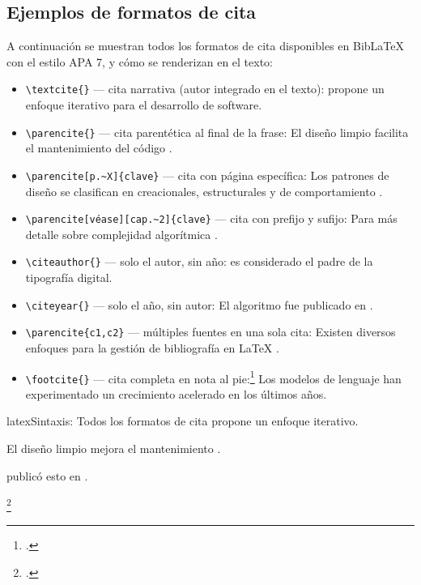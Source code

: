 \subsection{Ejemplos de formatos de cita}
\label{subsec:ejemplos-formatos-cita}

A continuación se muestran todos los formatos de cita disponibles en BibLaTeX
con el estilo APA 7, y cómo se renderizan en el texto:

\begin{itemize}
  \item \verb|\textcite{}| --- cita narrativa (autor integrado en el texto):
    \textcite{pressman2020} propone un enfoque iterativo para el desarrollo de software.
  \item \verb|\parencite{}| --- cita parentética al final de la frase:
    El diseño limpio facilita el mantenimiento del código \parencite{martin2019}.
  \item \verb|\parencite[p.~X]{clave}| --- cita con página específica:
    Los patrones de diseño se clasifican en creacionales, estructurales y de comportamiento
    \parencite[p.~10]{gamma1994}.
  \item \verb|\parencite[véase][cap.~2]{clave}| --- cita con prefijo y sufijo:
    Para más detalle sobre complejidad algorítmica \parencite[véase][cap.~2]{cormen2022}.
  \item \verb|\citeauthor{}| --- solo el autor, sin año:
    \citeauthor{knuth1997} es considerado el padre de la tipografía digital.
  \item \verb|\citeyear{}| --- solo el año, sin autor:
    El algoritmo fue publicado en \citeyear{knuth1997}.
  \item \verb|\parencite{c1,c2}| --- múltiples fuentes en una sola cita:
    Existen diversos enfoques para la gestión de bibliografía en \LaTeX{}
    \parencite{knuth1984texbook,lamport1994latex}.
  \item \verb|\footcite{}| --- cita completa en nota al pie:\footcite{chen2023}
    Los modelos de lenguaje han experimentado un crecimiento acelerado en los últimos años.
\end{itemize}

\begin{codigosimple}{latex}{Sintaxis: Todos los formatos de cita}
\textcite{pressman2020} propone un enfoque iterativo.

El diseño limpio mejora el mantenimiento \parencite{martin2019}.

\parencite[p.~10]{gamma1994}

\parencite[véase][]{cormen2022}

\citeauthor{knuth1997} publicó esto en \citeyear{knuth1997}.

\parencite{knuth1984texbook,lamport1994latex}

\footcite{chen2023}
\end{codigosimple}

